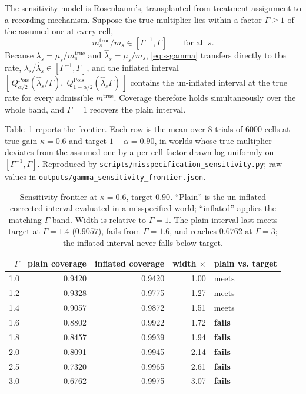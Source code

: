 \documentclass[journal,10pt,onecolumn]{IEEEtran}
\begin{document}
The sensitivity model is Rosenbaum's, transplanted from treatment assignment to a
recording mechanism. Suppose the true multiplier lies within a factor
$\Gamma \ge 1$ of the assumed one at every cell,
\begin{equation}
\label{eq:s-gamma}
m^{\mathrm{true}}_s / m_s \in [\Gamma^{-1}, \Gamma]
\qquad \text{for all } s .
\end{equation}
Because $\lambda_s = \mu_s/m^{\mathrm{true}}_s$ and
$\hat{\lambda}_s = \mu_s/m_s$, \eqref{eq:s-gamma} transfers directly to the rate,
$\lambda_s/\hat{\lambda}_s \in [\Gamma^{-1},\Gamma]$, and the inflated interval
$[\,Q^{\mathrm{Pois}}_{\alpha/2}(\hat{\lambda}_s/\Gamma),\;
Q^{\mathrm{Pois}}_{1-\alpha/2}(\hat{\lambda}_s\Gamma)\,]$ contains the
un-inflated interval at the true rate for every admissible
$m^{\mathrm{true}}$. Coverage therefore holds simultaneously over the whole band,
and $\Gamma = 1$ recovers the plain interval.

Table~\ref{tab:s-gamma} reports the frontier. Each row is the mean over $8$
trials of $6000$ cells at true gain $\kappa = 0.6$ and target $1-\alpha = 0.90$,
in worlds whose true multiplier deviates from the assumed one by a per-cell factor
drawn log-uniformly on $[\Gamma^{-1},\Gamma]$. Reproduced by
\texttt{scripts/misspecification\_sensitivity.py}; raw values in
\texttt{outputs/gamma\_sensitivity\_frontier.json}.

\begin{table}[!t]
  \centering
  \caption{Sensitivity frontier at $\kappa = 0.6$, target $0.90$. ``Plain'' is
  the un-inflated corrected interval evaluated in a misspecified world;
  ``inflated'' applies the matching $\Gamma$ band. Width is relative to
  $\Gamma = 1$. The plain interval last meets target at $\Gamma = 1.4$
  ($0.9057$), fails from $\Gamma = 1.6$, and reaches $0.6762$ at $\Gamma = 3$;
  the inflated interval never falls below target.}
  \label{tab:s-gamma}
  \begin{tabular}{r rr r l}
    \toprule
    $\Gamma$ & \textbf{plain coverage} & \textbf{inflated coverage}
    & \textbf{width $\times$} & \textbf{plain vs. target} \\
    \midrule
    1.0 & 0.9420 & 0.9420 & 1.00 & meets \\
    1.2 & 0.9328 & 0.9775 & 1.27 & meets \\
    1.4 & 0.9057 & 0.9872 & 1.51 & meets \\
    1.6 & 0.8802 & 0.9922 & 1.72 & \textbf{fails} \\
    1.8 & 0.8457 & 0.9939 & 1.94 & \textbf{fails} \\
    2.0 & 0.8091 & 0.9945 & 2.14 & \textbf{fails} \\
    2.5 & 0.7320 & 0.9965 & 2.61 & \textbf{fails} \\
    3.0 & 0.6762 & 0.9975 & 3.07 & \textbf{fails} \\
    \bottomrule
  \end{tabular}
\end{table}
\end{document}
